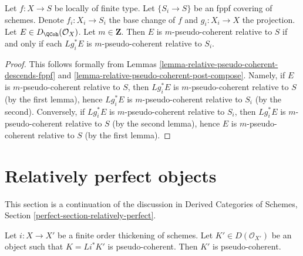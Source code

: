 \begin{lemma}
\label{lemma-relative-pseudo-coherent-descends-fppf-base}
Let $f : X \to S$ be locally of finite type.
Let $\{S_i \to S\}$ be an fppf covering of schemes.
Denote $f_i : X_i \to S_i$ the base change of $f$
and $g_i : X_i \to X$ the projection.
Let $E \in D_\QCoh(\mathcal{O}_X)$. Let $m \in \mathbf{Z}$.
Then $E$ is $m$-pseudo-coherent relative to $S$
if and only if each $Lg_i^*E$ is $m$-pseudo-coherent relative to $S_i$.
\end{lemma}

\begin{proof}
This follows formally from
Lemmas \ref{lemma-relative-pseudo-coherent-descends-fppf} and
\ref{lemma-relative-pseudo-coherent-post-compose}.
Namely, if $E$ is $m$-pseudo-coherent relative to $S$,
then $Lg_i^*E$ is $m$-pseudo-coherent relative to $S$ (by the first lemma),
hence $Lg_i^*E$ is $m$-pseudo-coherent relative to $S_i$ (by the second).
Conversely, if
$Lg_i^*E$ is $m$-pseudo-coherent relative to $S_i$, then
$Lg_i^*E$ is $m$-pseudo-coherent relative to $S$ (by the second lemma),
hence $E$ is $m$-pseudo-coherent relative to $S$ (by the first lemma).
\end{proof}






\section{Relatively perfect objects}
\label{section-relatively-perfect}

\noindent
This section is a continuation of the discussion in
Derived Categories of Schemes, Section
\ref{perfect-section-relatively-perfect}.

\begin{lemma}
\label{lemma-thickening-pseudo-coherent}
Let $i : X \to X'$ be a finite order thickening of schemes. Let
$K' \in D(\mathcal{O}_{X'})$ be an object such that
$K = Li^*K'$ is pseudo-coherent. Then $K'$ is pseudo-coherent.
\end{lemma}

